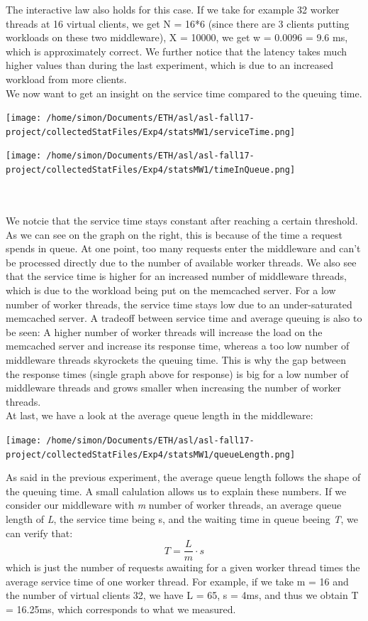 \documentclass[11pt,a4paper]{article}
\begin{document}
The interactive law also holds for this case. If we take for example 32 worker threads at 16 virtual clients, we get N = 16*6 (since there are 3 clients putting workloads on these two middleware), X = 10000, we get w = 0.0096 = 9.6 ms, which is approximately correct. 
We further notice that the latency takes much higher values than during the last experiment, which is due to an increased workload from more clients. 
\\
We now want to get an insight on the service time compared to the queuing time.
\\
\begin{minipage}{0.5\linewidth}
\texttt{[image: /home/simon/Documents/ETH/asl/asl-fall17-project/collectedStatFiles/Exp4/statsMW1/serviceTime.png]}
\end{minipage}
\hfill
\begin{minipage}{0.5\linewidth}
\texttt{[image: /home/simon/Documents/ETH/asl/asl-fall17-project/collectedStatFiles/Exp4/statsMW1/timeInQueue.png]}
\end{minipage}
\\\\
We notcie that the service time stays constant after reaching a certain threshold. As we can see on the graph on the right, this is because of the time a request spends in queue. At one point, too many requests enter the middleware and can't be processed directly due to the number of available worker threads. We also see that the service time is higher for an increased number of middleware threads, which is due to the workload being put on the memcached server. For a low number of worker threads, the service time stays low due to an under-saturated memcached server. 
A tradeoff between service time and average queuing is also to be seen: A higher number of worker threads will increase the load on the memcached server and increase its response time, whereas a too low number of middleware threads skyrockets the queuing time. This is why the gap between the response times (single graph above for response) is big for a low number of middleware threads and grows smaller when increasing the number of worker threads. 
\\
At last, we have a look at the average queue length in the middleware:
\begin{center}
\texttt{[image: /home/simon/Documents/ETH/asl/asl-fall17-project/collectedStatFiles/Exp4/statsMW1/queueLength.png]}
\end{center}
As said in the previous experiment, the average queue length follows the shape of the queuing time. A small calulation allows us to explain these numbers. 
If we consider our middleware with \textit{m} number of worker threads, an average queue length of \textit{L}, the service time being {s}, and the waiting time in queue beeing \textit{T}, we can verify that: 
\[ T = \frac{L}{m}\cdot s \]
which is just the number of requests awaiting for a given worker thread times the average service time of one worker thread. For example, if we take m = 16 and the number of virtual clients 32, we have L = 65, s = 4ms, and thus we obtain T = 16.25ms, which corresponds to what we measured. 
\end{document}
